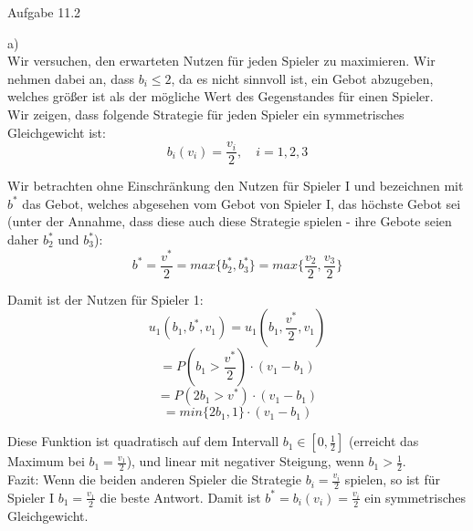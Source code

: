 \documentclass{scrartcl}
\begin{document}
\begin{Large}
Aufgabe 11.2\\[0.0cm]
\end{Large}

a) \\

Wir versuchen, den erwarteten Nutzen für jeden Spieler zu maximieren. Wir nehmen dabei an,
dass $b_i \leq 2$, da es nicht sinnvoll ist, ein Gebot abzugeben, welches größer ist als der
mögliche Wert des Gegenstandes für einen Spieler. \\

Wir zeigen, dass folgende Strategie für jeden Spieler ein symmetrisches Gleichgewicht ist: \\

\[
b_i(v_i) = \frac{v_i}{2}, \quad i = 1, 2, 3
\]

Wir betrachten ohne Einschränkung den Nutzen für Spieler I und bezeichnen mit $b^*$ das
Gebot, welches abgesehen vom Gebot von Spieler I, das höchste Gebot sei (unter der
Annahme, dass diese auch diese Strategie spielen - ihre Gebote seien daher $b^*_2$ und
$b^*_3$): \\

\[
b^* = \frac{v^*}{2}= max \{b^*_2, b^*_3\} = max \{\frac{v_2}{2}, \frac{v_3}{2}\}
\]

Damit ist der Nutzen für Spieler 1: \\

\[
u_1(b_1, b^*, v_1) = u_1(b_1, \frac{v^*}{2}, v_1)
\]
\[
= P(b_1 > \frac{v^*}{2}) \cdot (v_1 - b_1)
\]
\[
= P(2b_1 > v^*) \cdot (v_1 - b_1)
\]
\[
= min\{2b_1,1\} \cdot (v_1 - b_1)
\]

Diese Funktion ist quadratisch auf dem Intervall $b_1 \in [0, \frac{1}{2}]$ (erreicht
das Maximum bei $b_1 = \frac{v_1}{2}$), und linear mit negativer Steigung, wenn
$b_1 > \frac{1}{2}$. \\

Fazit: Wenn die beiden anderen Spieler die Strategie $b_i = \frac{v_i}{2}$ spielen,
so ist für Spieler I $b_1 = \frac{v_1}{2}$ die beste Antwort. Damit ist $b^* =
b_i(v_i) = \frac{v_i}{2}$ ein symmetrisches Gleichgewicht.
\end{document}
